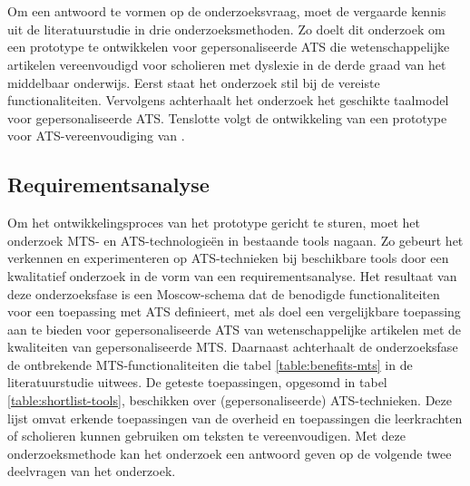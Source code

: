 
\chapter{}%
\label{ch:methodologie}


Om een antwoord te vormen op de onderzoeksvraag, moet de vergaarde kennis uit de literatuurstudie in drie onderzoeksmethoden. Zo doelt dit onderzoek om een prototype te ontwikkelen voor gepersonaliseerde ATS die wetenschappelijke artikelen vereenvoudigd voor scholieren met dyslexie in de derde graad van het middelbaar onderwijs. Eerst staat het onderzoek stil bij de vereiste functionaliteiten. Vervolgens achterhaalt het onderzoek het geschikte taalmodel voor gepersonaliseerde ATS. Tenslotte volgt de ontwikkeling van een prototype voor ATS-vereenvoudiging van .

\section{Requirementsanalyse}
\label{sec:requirementsanalyse}

Om het ontwikkelingsproces van het prototype gericht te sturen, moet het onderzoek MTS- en ATS-technologieën in bestaande tools nagaan. Zo gebeurt het verkennen en experimenteren op ATS-technieken bij beschikbare tools door een kwalitatief onderzoek in de vorm van een requirementsanalyse. Het resultaat van deze onderzoeksfase is een Moscow-schema dat de benodigde functionaliteiten voor een toepassing met ATS definieert, met als doel een vergelijkbare toepassing aan te bieden voor gepersonaliseerde ATS van wetenschappelijke artikelen met de kwaliteiten van gepersonaliseerde MTS. Daarnaast achterhaalt de onderzoeksfase de ontbrekende MTS-functionaliteiten die tabel \ref{table:benefits-mts} in de literatuurstudie uitwees. De geteste toepassingen, opgesomd in tabel \ref{table:shortlist-tools}, beschikken over (gepersonaliseerde) ATS-technieken. Deze lijst omvat erkende toepassingen van de overheid en toepassingen die leerkrachten of scholieren kunnen gebruiken om teksten te vereenvoudigen. Met deze onderzoeksmethode kan het onderzoek een antwoord geven op de volgende twee deelvragen van het onderzoek.

